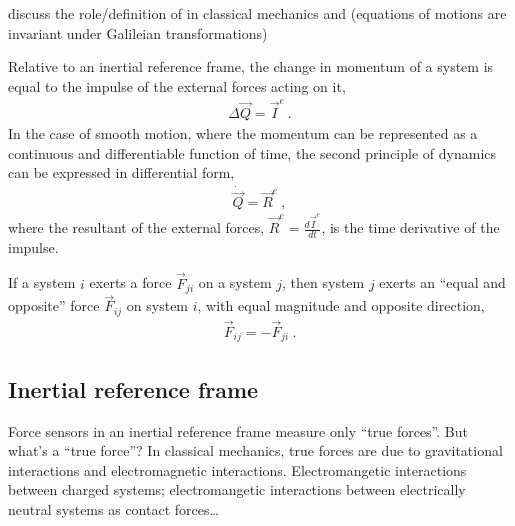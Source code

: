 \documentclass[letterpaper,10pt,english]{jupyterBook}
\begin{document}
\sphinxAtStartPar
{} discuss the role/definition of  in classical mechanics and  (equations of motions are invariant under Galileian transformations)

\sphinxAtStartPar
{} Relative to an inertial reference frame, the change in momentum of a system is equal to the impulse of the external forces acting on it,
\begin{equation*}
\begin{split}\Delta \vec{Q} = \vec{I}^e \ .\end{split}
\end{equation*}
\sphinxAtStartPar
In the case of smooth motion, where the momentum can be represented as a continuous and differentiable function of time, the second principle of dynamics can be expressed in differential form,
\begin{equation*}
\begin{split}\dot{\vec{Q}} = \vec{R}^e \ ,\end{split}
\end{equation*}
\sphinxAtStartPar
where the resultant of the external forces, \(\vec{R}^e = \frac{d \vec{I}^e}{dt}\), is the time derivative of the impulse.

\sphinxAtStartPar
{} If a system \(i\) exerts a force \(\vec{F}_{ji}\) on a system \(j\), then system \(j\) exerts an “equal and opposite” force \(\vec{F}_{ij}\) on system \(i\), with equal magnitude and opposite direction,
\begin{equation*}
\begin{split}\vec{F}_{ij} = - \vec{F}_{ji} \ .\end{split}
\end{equation*}

\subsection{Inertial reference frame}
\label{\detokenize{ch/dynamics-principles:inertial-reference-frame}}\label{\detokenize{ch/dynamics-principles:classical-mehcanics-dynamics-principles-inertial-ref-frame}}
\sphinxAtStartPar
Force sensors in an inertial reference frame measure only “true forces”. But what’s a “true force”? In classical mechanics, true forces are due to gravitational interactions and electromagnetic interactions. Electromangetic interactions between charged systems; electromangetic interactions between electrically neutral systems as contact forces…
\end{document}

